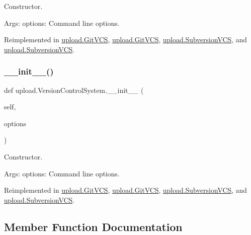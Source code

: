 \begin{DoxyVerb}Constructor.

Args:
  options: Command line options.
\end{DoxyVerb}
 

Reimplemented in \mbox{\hyperlink{classupload_1_1GitVCS_aba4e1dca1c4b3e5db7ba07f6bce3c839}{upload.\+Git\+V\+CS}}, \mbox{\hyperlink{classupload_1_1GitVCS_aba4e1dca1c4b3e5db7ba07f6bce3c839}{upload.\+Git\+V\+CS}}, \mbox{\hyperlink{classupload_1_1SubversionVCS_a8333f94e27335ce83eed0cc3f5a1eeb0}{upload.\+Subversion\+V\+CS}}, and \mbox{\hyperlink{classupload_1_1SubversionVCS_a8333f94e27335ce83eed0cc3f5a1eeb0}{upload.\+Subversion\+V\+CS}}.

\mbox{\label{classupload_1_1VersionControlSystem_ace97e5785a2b40011404ae6fbb956ecf}} 
\subsubsection{\texorpdfstring{\_\_init\_\_()}{\_\_init\_\_()}\hspace{0.1cm}{\footnotesize\ttfamily [2/2]}}
{\footnotesize\ttfamily def upload.\+Version\+Control\+System.\+\_\+\+\_\+init\+\_\+\+\_\+ (\begin{DoxyParamCaption}\item[{}]{self,  }\item[{}]{options }\end{DoxyParamCaption})}

\begin{DoxyVerb}Constructor.

Args:
  options: Command line options.
\end{DoxyVerb}
 

Reimplemented in \mbox{\hyperlink{classupload_1_1GitVCS_aba4e1dca1c4b3e5db7ba07f6bce3c839}{upload.\+Git\+V\+CS}}, \mbox{\hyperlink{classupload_1_1GitVCS_aba4e1dca1c4b3e5db7ba07f6bce3c839}{upload.\+Git\+V\+CS}}, \mbox{\hyperlink{classupload_1_1SubversionVCS_a8333f94e27335ce83eed0cc3f5a1eeb0}{upload.\+Subversion\+V\+CS}}, and \mbox{\hyperlink{classupload_1_1SubversionVCS_a8333f94e27335ce83eed0cc3f5a1eeb0}{upload.\+Subversion\+V\+CS}}.



\subsection{Member Function Documentation}
\mbox{\label{classupload_1_1VersionControlSystem_ad2923d691a1b1047e9359c5b7c1c103f}} 

